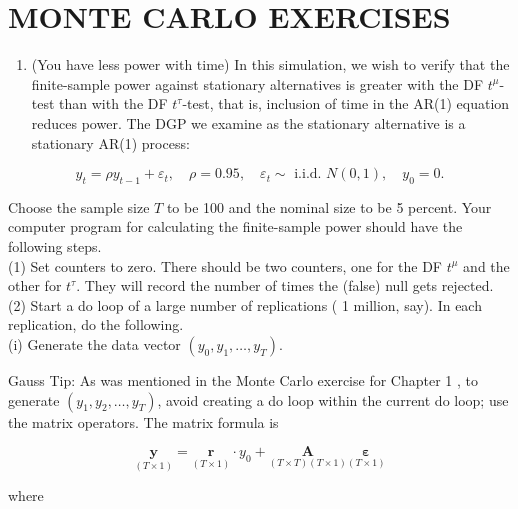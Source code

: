 \documentclass[10pt]{article}
\begin{document}
\section*{MONTE CARLO EXERCISES}
\begin{enumerate}
  \item (You have less power with time) In this simulation, we wish to verify that the finite-sample power against stationary alternatives is greater with the DF $t^{\mu}$-test than with the DF $t^{\tau}$-test, that is, inclusion of time in the AR(1) equation reduces power. The DGP we examine as the stationary alternative is a stationary AR(1) process:
\end{enumerate}

$$
y_{t}=\rho y_{t-1}+\varepsilon_{t}, \quad \rho=0.95, \quad \varepsilon_{t} \sim \text { i.i.d. } N(0,1), \quad y_{0}=0 .
$$

Choose the sample size $T$ to be 100 and the nominal size to be 5 percent. Your computer program for calculating the finite-sample power should have the following steps.\\
(1) Set counters to zero. There should be two counters, one for the DF $t^{\mu}$ and the other for $t^{\tau}$. They will record the number of times the (false) null gets rejected.\\
(2) Start a do loop of a large number of replications ( 1 million, say). In each replication, do the following.\\
(i) Generate the data vector $\left(y_{0}, y_{1}, \ldots, y_{T}\right)$.

Gauss Tip: As was mentioned in the Monte Carlo exercise for Chapter 1 , to generate $\left(y_{1}, y_{2}, \ldots, y_{T}\right)$, avoid creating a do loop within the current do loop; use the matrix operators. The matrix formula is

$$
\underset{(T \times 1)}{\mathbf{y}}=\underset{(T \times 1)}{\mathbf{r}} \cdot y_{0}+\underset{(T \times T)(T \times 1)}{\mathbf{A}} \underset{(T \times 1)}{\boldsymbol{\varepsilon}}
$$

where
\end{document}
